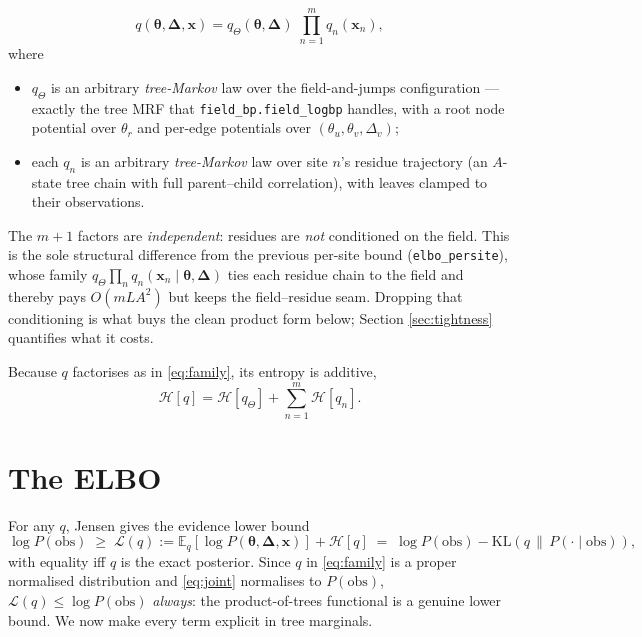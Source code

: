 \documentclass[11pt]{article}
\newcommand{\btheta}{\bm{\theta}}
\newcommand{\bDelta}{\bm{\Delta}}
\newcommand{\bx}{\bm{x}}
\newcommand{\Eq}[2]{\mathbb{E}_{#1}\!\left[#2\right]}
\newcommand{\KL}[2]{\mathrm{KL}\!\left(#1\,\|\,#2\right)}
\newcommand{\Ent}[1]{\mathcal{H}\!\left[#1\right]}
\begin{document}
\begin{equation}
q(\btheta,\bDelta,\bx)
  = q_\Theta(\btheta,\bDelta)\;\prod_{n=1}^{m} q_n(\bx_n),
\label{eq:family}
\end{equation}
where
\begin{itemize}
\item $q_\Theta$ is an arbitrary \emph{tree-Markov} law over the
      field-and-jumps configuration --- exactly the tree MRF that
      \texttt{field\_bp.field\_logbp} handles, with a root node potential
      over $\theta_r$ and per-edge potentials over
      $(\theta_u,\theta_v,\Delta_v)$;
\item each $q_n$ is an arbitrary \emph{tree-Markov} law over site $n$'s
      residue trajectory (an $A$-state tree chain with full parent--child
      correlation), with leaves clamped to their observations.
\end{itemize}
The $m+1$ factors are \emph{independent}: residues are \emph{not} conditioned
on the field. This is the sole structural difference from the previous
per-site bound (\texttt{elbo\_persite}), whose family
$q_\Theta\prod_n q_n(\bx_n\mid\btheta,\bDelta)$ ties each residue chain to the
field and thereby pays $O(mLA^2)$ but keeps the field--residue seam. Dropping
that conditioning is what buys the clean product form below; Section
\ref{sec:tightness} quantifies what it costs.

Because $q$ factorises as in \eqref{eq:family}, its entropy is additive,
\begin{equation}
\Ent{q} = \Ent{q_\Theta}+\sum_{n=1}^m\Ent{q_n}.
\label{eq:entropy-split}
\end{equation}

\section{The ELBO}

For any $q$, Jensen gives the evidence lower bound
\begin{equation}
\log P(\mathrm{obs}) \;\ge\; \mathcal L(q)
   := \Eq{q}{\log P(\btheta,\bDelta,\bx)} + \Ent{q}
   \;=\; \log P(\mathrm{obs}) - \KL{q}{P(\cdot\mid\mathrm{obs})},
\label{eq:elbo-def}
\end{equation}
with equality iff $q$ is the exact posterior. Since $q$ in \eqref{eq:family}
is a proper normalised distribution and \eqref{eq:joint} normalises to
$P(\mathrm{obs})$, $\mathcal L(q)\le\log P(\mathrm{obs})$ \emph{always}: the
product-of-trees functional is a genuine lower bound. We now make every term
explicit in tree marginals.
\end{document}

